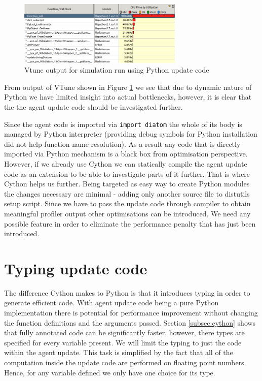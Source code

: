 \documentclass[12pt, a4paper]{report}
\begin{document}
\begin{figure}[H]
  \begin{center}
    \includegraphics[width=0.7\textwidth,natwidth=696,natheight=271]{images/vtune-cython-pure.png}
    \caption{Vtune output for simulation run using Python update code}
    \label{fig:vtune-cython-perf}
  \end{center}
\end{figure}

From output of VTune shown in Figure \ref{fig:vtune-cython-perf} we see
that due to dynamic nature of Python we have limited insight into actual bottlenecks,
however, it is clear that the the agent update code should be investigated further.

Since the agent code is imported via \lstinline{import diatom} the whole of its body
is managed by Python interpreter (providing debug symbols for Python installation did
not help function name resolution). As a result any code that is directly imported via
Python mechanism is a black box from optimisation perspective. However, if we already
use Cython we can statically compile the agent update code as an extension
to be able to investigate parts of it further. That is where Cython helps
us further. Being targeted as easy way to create Python modules the changes necessary
are minimal - adding only another source file to distutils setup script.
Since we have to pass the update code through compiler to obtain meaningful profiler
output other optimisations can be introduced. We need any possible feature
in order to eliminate the performance penalty that has just been introduced.

\section{Typing update code}\label{sec:embed-py-type}
The difference Cython makes to Python is that it introduces typing in order to generate
efficient code. With agent update code being a pure Python implementation there is
potential for performance improvement without changing the function definitions
and the arguments passed. Section \ref{subsec:cython} shows that fully annotated
code can be significantly faster, however, there types are specified for every
variable present. We will limit the typing to just the code within the agent update.
This task is simplified by the fact that all of the computation inside the update
code are performed on floating point numbers. Hence, for any variable defined we
only have one choice for its type.
\end{document}
